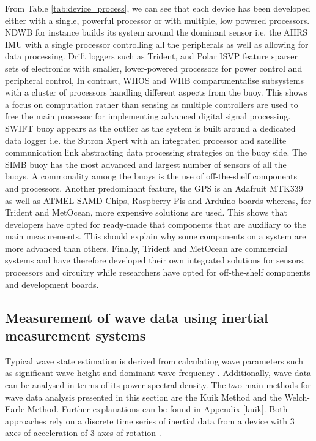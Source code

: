 From Table \ref{tab:device_process}, we can see that each device has been developed either with a single, powerful processor or with multiple, low powered processors. NDWB for instance builds its system around the dominant sensor i.e. the AHRS IMU with a single processor controlling all the peripherals as well as allowing for data processing. Drift loggers such as Trident, and Polar ISVP feature sparser sets of electronics with smaller, lower-powered processors for power control and peripheral control, In contrast, WIIOS and WIIB compartmentalise subsystems with a cluster of processors handling different aspects from the buoy. This shows a focus on computation rather than sensing as multiple controllers are used to free the main processor for implementing advanced digital signal processing. SWIFT buoy appears as the outlier as the system is built around a dedicated data logger i.e. the Sutron Xpert with an integrated processor and satellite communication link abstracting data processing strategies on the buoy side. The SIMB buoy has the most advanced and largest number of sensors of all the buoys. A commonality among the buoys is the use of off-the-shelf components and processors. Another predominant feature, the GPS is an Adafruit MTK339 as well as ATMEL SAMD Chips, Raspberry Pis and Arduino boards whereas, for Trident and MetOcean, more expensive solutions are used. This shows that developers have opted for ready-made that components that are auxiliary to the main measurements. This should explain why some components on a system are more advanced than others. Finally, Trident and MetOcean are commercial systems and have therefore developed their own integrated solutions for sensors, processors and circuitry while researchers have opted for off-the-shelf components and development boards.



\subsection{Measurement of wave data using inertial measurement systems}

Typical wave state estimation is derived from calculating wave parameters such as significant wave height and dominant wave frequency \cite{williams2013wave}. Additionally, wave data can be analysed in terms of its power spectral density. The two main methods for wave data analysis presented in this section are the Kuik Method and the Welch-Earle Method. Further explanations can be found in Appendix \ref{kuik}. Both approaches rely on a discrete time series of inertial data from a device with 3 axes of acceleration of 3 axes of rotation \cite{kuik1988method,earle1996nondirectional}.

